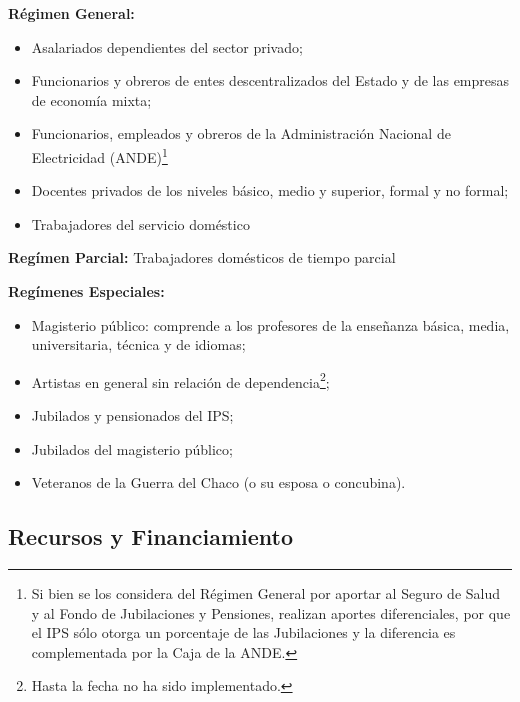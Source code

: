 \textbf{Régimen General:}

\begin {itemize}

\item Asalariados dependientes del sector privado; 

\item Funcionarios y obreros de entes descentralizados del Estado y de las empresas de economía mixta;

\item Funcionarios, empleados y obreros de la Administración Nacional de Electricidad (ANDE)\footnote{Si bien se los considera del Régimen General por aportar al Seguro de Salud y al Fondo de Jubilaciones y Pensiones, realizan aportes diferenciales, por
que el IPS sólo otorga un porcentaje de las Jubilaciones y la diferencia es complementada por la Caja de la ANDE.}

\item Docentes privados de los niveles básico, medio y superior, formal y no formal;

\item Trabajadores del servicio doméstico

\end{itemize}

\textbf{Regímen Parcial:} Trabajadores domésticos de tiempo parcial

\textbf{Regímenes Especiales:}

\begin{itemize}


\item Magisterio público: comprende a los profesores de la enseñanza básica, media, universitaria, técnica y de idiomas;

 \item Artistas en general sin relación de dependencia\footnote{ Hasta la fecha no ha sido implementado.};
 
 \item Jubilados y pensionados del IPS;
 
 \item Jubilados del magisterio público;
 
 \item Veteranos de la Guerra del Chaco (o su esposa o concubina).
 
\end{itemize}

\subsection{Recursos y Financiamiento}


